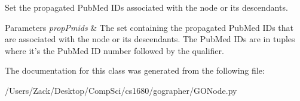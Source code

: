 Set the propagated Pub\-Med I\-Ds associated with the node or its descendants. 


\begin{DoxyParams}{Parameters}
{\em prop\-Pmids} & The set containing the propagated Pub\-Med I\-Ds that are associated with the node or its descendants. The Pub\-Med I\-Ds are in tuples where it's the Pub\-Med I\-D number followed by the qualifier. \\
\hline
\end{DoxyParams}


The documentation for this class was generated from the following file\-:\begin{DoxyCompactItemize}
\item 
/\-Users/\-Zack/\-Desktop/\-Comp\-Sci/cs1680/gographer/G\-O\-Node.\-py\end{DoxyCompactItemize}
